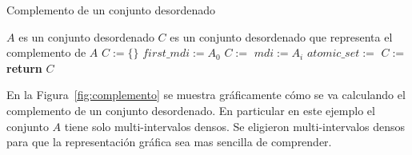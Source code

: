 \begin{algorithm}
\caption{Complemento de un conjunto desordenado}\label{alg:complementDes}
\begin{algorithmic}[1]
\Require $A$ es un conjunto desordenado 
\Ensure $C$ es un conjunto desordenado que representa el complemento de $A$
\State $C := \{\}$
\State $first\_mdi := A_0$
\State $C :=$   
    \State $mdi := A_i$
    \State $atomic\_set :=$ 
    \State $C :=$ 
\EndFor
\State \textbf{return} $C$
\EndFunction
\end{algorithmic}
\end{algorithm}



En la Figura~\ref{fig:complemento} se muestra gráficamente cómo se va calculando el complemento de un conjunto desordenado. En particular en este ejemplo el conjunto $A$ tiene solo multi-intervalos densos. Se eligieron multi-intervalos densos para que la representación gráfica sea mas sencilla de comprender.

